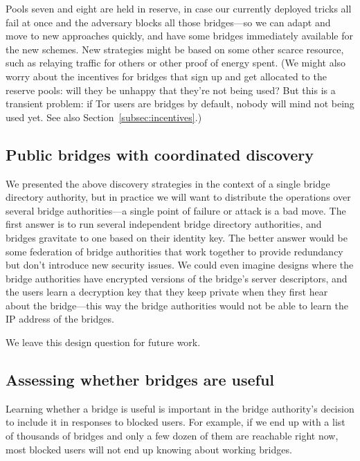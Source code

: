 \documentclass{llncs}
\begin{document}
Pools seven and eight are held in reserve, in case our currently deployed
tricks all fail at once and the adversary blocks all those bridges---so
we can adapt and move to new approaches quickly, and have some bridges
immediately available for the new schemes. New strategies might be based
on some other scarce resource, such as relaying traffic for others or
other proof of energy spent. (We might also worry about the incentives
for bridges that sign up and get allocated to the reserve pools: will they
be unhappy that they're not being used? But this is a transient problem:
if Tor users are bridges by default, nobody will mind not being used yet.
See also Section~\ref{subsec:incentives}.)


\subsection{Public bridges with coordinated discovery}

We presented the above discovery strategies in the context of a single
bridge directory authority, but in practice we will want to distribute the
operations over several bridge authorities---a single point of failure
or attack is a bad move. The first answer is to run several independent
bridge directory authorities, and bridges gravitate to one based on
their identity key. The better answer would be some federation of bridge
authorities that work together to provide redundancy but don't introduce
new security issues. We could even imagine designs where the bridge
authorities have encrypted versions of the bridge's server descriptors,
and the users learn a decryption key that they keep private when they
first hear about the bridge---this way the bridge authorities would not
be able to learn the IP address of the bridges.

We leave this design question for future work.

\subsection{Assessing whether bridges are useful}

Learning whether a bridge is useful is important in the bridge authority's
decision to include it in responses to blocked users. For example, if
we end up with a list of thousands of bridges and only a few dozen of
them are reachable right now, most blocked users will not end up knowing
about working bridges.
\end{document}
